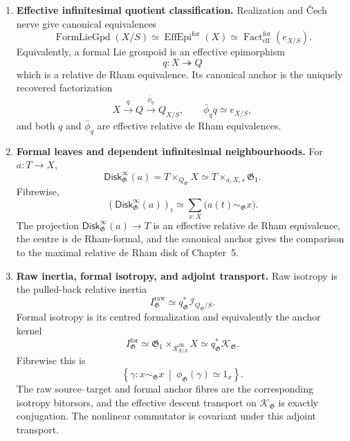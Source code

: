 \begin{theorem}
\begin{enumerate}
    \item \textbf{Effective infinitesimal quotient classification.}
    Realization and \v{C}ech nerve give canonical equivalences
    \[
        \operatorname{FormLieGpd}(X/S)
        \simeq
        \operatorname{EffEpi}^{\mathrm{for}}(X)
        \simeq
        \operatorname{Fact}^{\mathrm{for}}_{\mathrm{eff}}(e_{X/S}).
    \]
    Equivalently, a formal Lie groupoid is an effective epimorphism
    \[
        q:X\twoheadrightarrow Q
    \]
    which is a relative de Rham equivalence.  Its canonical anchor is the
    uniquely recovered factorization
    \[
        X
        \xrightarrow{q}
        Q
        \xrightarrow{\bar\phi_q}
        Q_{X/S},
        \qquad
        \bar\phi_q q\simeq e_{X/S},
    \]
    and both $q$ and $\bar\phi_q$ are effective relative de Rham equivalences.

    \item \textbf{Formal leaves and dependent infinitesimal neighbourhoods.}
    For
    $a:T\to X$,
    \[
        \mathsf{Disk}^{\infty}_{\mathfrak G}(a)
        =
        T\times_{Q_{\mathfrak G}}X
        \simeq
        T\times_{a,X,s}\mathfrak G_1.
    \]
    Fibrewise,
    \[
        \left(\mathsf{Disk}^{\infty}_{\mathfrak G}(a)\right)_t
        \simeq
        \sum_{x:X}
        \bigl(a(t)\sim_{\mathfrak G}x\bigr).
    \]
    The projection
    $\mathsf{Disk}^{\infty}_{\mathfrak G}(a)\to T$ is an effective relative de Rham
    equivalence, the centre is de Rham-formal, and the canonical anchor gives
    the comparison to the maximal relative de Rham disk of Chapter~5.

    \item \textbf{Raw inertia, formal isotropy, and adjoint transport.}
    Raw isotropy is the pulled-back relative inertia
    \[
        I^{\mathrm{raw}}_{\mathfrak G}
        \simeq
        q_{\mathfrak G}^*
        \mathcal I_{Q_{\mathfrak G}/S}.
    \]
    Formal isotropy is its centred formalization and equivalently the anchor
    kernel
    \[
        I^{\mathrm{for}}_{\mathfrak G}
        \simeq
        \mathfrak G_1
        \times_{\mathcal R^{\mathrm{dR}}_{X/S}}
        X
        \simeq
        q_{\mathfrak G}^*\mathcal K_{\mathfrak G}.
    \]
    Fibrewise this is
    \[
        \left\{
            \gamma:x\sim_{\mathfrak G}x
            \ \middle|\
            \phi_{\mathfrak G}(\gamma)\simeq1_x
        \right\}.
    \]
    The raw source--target and formal anchor fibres are the corresponding
    isotropy bitorsors, and the effective descent transport on
    $\mathcal K_{\mathfrak G}$ is exactly conjugation.  The nonlinear
    commutator is covariant under this adjoint transport.


\end{enumerate}
\end{theorem}
